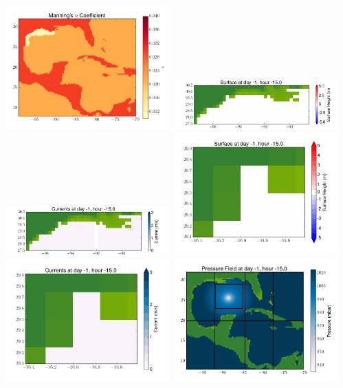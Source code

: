 \documentclass[11pt]{article}
\begin{document}
\vskip 10pt 
\includegraphics[width=0.475\textwidth]{frame0033fig3.png}
\includegraphics[width=0.475\textwidth]{frame0033fig4.png}
\vskip 10pt 
\includegraphics[width=0.475\textwidth]{frame0033fig5.png}
\includegraphics[width=0.475\textwidth]{frame0033fig6.png}
\vskip 10pt 
\includegraphics[width=0.475\textwidth]{frame0033fig7.png}
\includegraphics[width=0.475\textwidth]{frame0033fig8.png}
\end{document}
